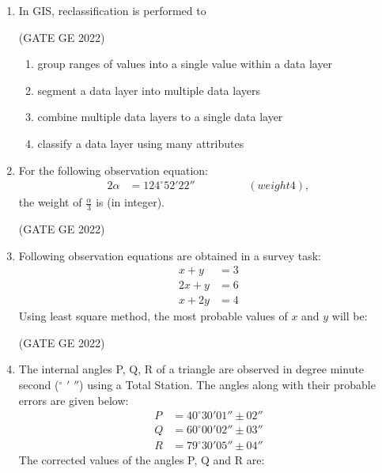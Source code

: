 \documentclass[journal,12pt,onecolumn]{IEEEtran}
\theoremstyle{remark}
\begin{document}
\begin{enumerate}
\item In GIS, reclassification is performed to

\hfill (GATE GE 2022)

\begin{enumerate}
    \item group ranges of values into a single value within a data layer
    \item segment a data layer into multiple data layers
    \item combine multiple data layers to a single data layer
    \item classify a data layer using many attributes
\end{enumerate}

\item For the following observation equation:
\begin{align*}
2\alpha &= 124^\circ 52' 22''\hspace{2cm}(weight 4),
\end{align*}
the weight of $\frac{\alpha}{3}$ is \makebox[1cm]{\hrulefill} (in integer).

\hfill (GATE GE 2022)

\item Following observation equations are obtained in a survey task:
\begin{align*}
x + y &= 3 \\
2x + y &= 6 \\
x + 2y &= 4
\end{align*}
Using least square method, the most probable values of $x$ and $y$ will be:

\hfill (GATE GE 2022)

\begin{enumerate}
\end{enumerate}

\item The internal angles P, Q, R of a triangle are observed in degree minute second ($^\circ$ $'$ $''$) using a Total Station. The angles along with their probable errors are given below:
\begin{align*}
P &= 40^\circ 30' 01'' \pm 02'' \\
Q &= 60^\circ 00' 02'' \pm 03'' \\
R &= 79^\circ 30' 05'' \pm 04''
\end{align*}
The corrected values of the angles P, Q and R are:


\end{enumerate}
\end{document}
